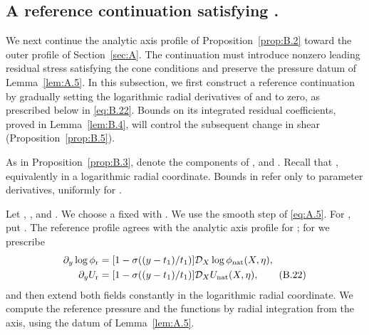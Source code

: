 \subsection{A reference continuation satisfying
.}\label{sec:B.5}
We next continue the analytic axis profile of Proposition~\ref{prop:B.2} toward the outer profile of
Section~\ref{sec:A}. The continuation must introduce nonzero leading residual stress
 satisfying the cone conditions and preserve the pressure datum
 of Lemma~\ref{lem:A.5}. In this subsection, we first construct a
reference continuation  by gradually setting the logarithmic radial
derivatives of  and  to zero, as prescribed below
in \eqref{eq:B.22}. Bounds on its integrated residual coefficients, proved in Lemma~\ref{lem:B.4},
will control the subsequent change in shear (Proposition~\ref{prop:B.5}).

As in Proposition~\ref{prop:B.3},  denote the components of
, and . Recall that
, equivalently  in a
logarithmic radial coordinate. Bounds in  refer only to parameter
derivatives, uniformly for .

Let , , and
. We choose a fixed  with
. We use the smooth step  of
\eqref{eq:A.5}. For , put
. The reference profile agrees with the analytic axis profile for
; for  we prescribe
\begin{align}
  \partial_y\log\phi_{\mathrm r}
    &=[1-\sigma((y-t_1)/t_1)]\mathcal D_X\log\phi_{\mathrm{nat}}(X,\eta),\notag\\
  \partial_yU_{\mathrm r}
    &=[1-\sigma((y-t_1)/t_1)]\mathcal D_XU_{\mathrm{nat}}(X,\eta),
  \tag{B.22}\label{eq:B.22}
\end{align}
and then extend both fields constantly in the logarithmic radial coordinate. We compute the
reference pressure and the functions  by radial integration from the
axis, using the datum of Lemma~\ref{lem:A.5}.

